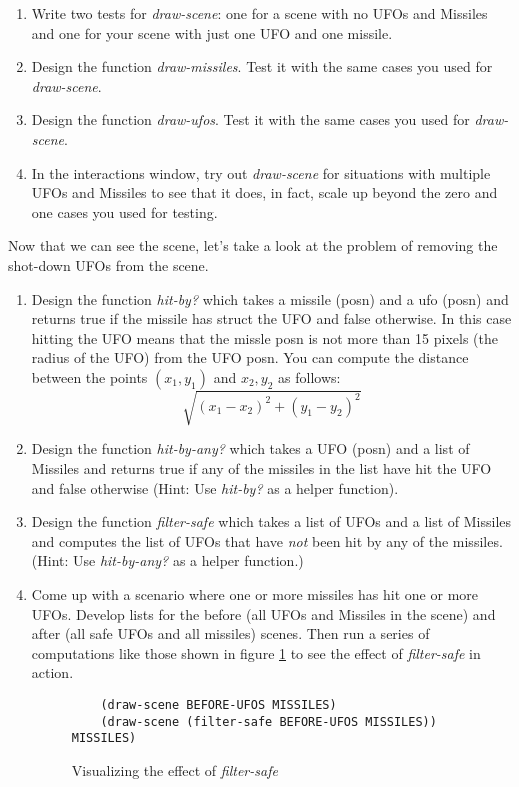 \documentclass[nobib]{tufte-handout}
\begin{document}
\begin{enumerate}[resume]
  \item Write two tests for \textit{draw-scene}: one for a scene with no UFOs and Missiles and one for your scene with just one UFO and one missile.
  \item Design the function \textit{draw-missiles}. Test it with the same cases you used for \textit{draw-scene}.
  \item Design the function \textit{draw-ufos}. Test it with the same cases you used for \textit{draw-scene}.
  \item In the interactions window, try out \textit{draw-scene} for situations with multiple UFOs and Missiles to see that it does, in fact, scale up beyond the zero and one cases you used for testing.
\end{enumerate}

Now that we can see the scene, let's take a look at the problem of removing the shot-down UFOs from the scene.

\begin{enumerate} [resume]
  \item Design the function \textit{hit-by?} which takes a missile (posn) and a ufo (posn) and returns true if the missile has struct the UFO and false otherwise. In this case hitting the UFO means that the missle posn is not more than 15 pixels (the radius of the UFO) from the UFO posn. You can compute the distance between the points \( (x_1,y_1) \) and \(x_2,y_2\) as follows:
  \[
  \sqrt{ (x_1-x_2)^2 + (y_1-y_2)^2 }
  \]
  \item Design the function \textit{hit-by-any?} which takes a UFO (posn) and a list of Missiles and returns true if any of the missiles in the list have hit the UFO and false otherwise (Hint: Use \textit{hit-by?} as a helper function).
  \item Design the function \textit{filter-safe} which takes a list of UFOs and a list of Missiles and computes the list of UFOs that have \textit{not} been hit by any of the missiles. (Hint: Use \textit{hit-by-any?} as a helper function.)
  \item Come up with a scenario where one or more missiles has hit one or more UFOs.  Develop lists for the before (all UFOs and Missiles in the scene) and after (all safe UFOs and all missiles) scenes. Then run a series of computations like those shown in figure \ref{animate} to see the effect of \textit{filter-safe} in action.

  \begin{figure}
    \begin{lstlisting}
    (draw-scene BEFORE-UFOS MISSILES)
    (draw-scene (filter-safe BEFORE-UFOS MISSILES)) MISSILES)
    \end{lstlisting}
    \caption{Visualizing the effect of \textit{filter-safe}}
    \label{animate}
  \end{figure}

\end{enumerate}
\end{document}
